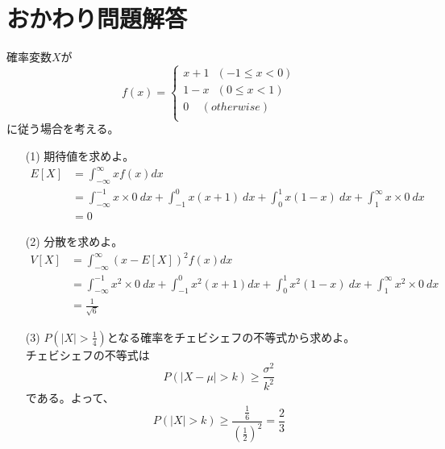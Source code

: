 \documentclass[a4j,uplatex,dvipdfmx]{jsarticle}
\begin{document}
\section*{おかわり問題解答}
確率変数$X$が
\begin{equation}
  f(x)=
 \begin{cases}
   x+1~~~(-1\le x<0)\\
   1-x~~~(0\le x<1)\\
   0~~~~~(otherwise)\\
 \end{cases}
\end{equation}
に従う場合を考える。
\begin{itemize}
  \item[(1)] 期待値を求めよ。
   \begin{equation}
     \begin{split}
       E[X] &= \int_{-\infty}^{\infty} x f(x) dx\\
       &= \int_{-\infty}^{-1} x\times 0\ dx + \int_{-1}^{0} x(x+1)\ dx + \int_{0}^{1} x(1-x)\ dx + \int_{1}^{\infty} x \times 0\ dx \\
       &= 0
     \end{split}
   \end{equation}
  \item[(2)] 分散を求めよ。
  \begin{equation}
    \begin{split}
      V[X] &= \int_{-\infty}^{\infty} (x-E[X])^2f(x) dx \\
      &=\int_{-\infty}^{-1} x^2\times 0\ dx + \int_{-1}^{0} x^2(x+1) dx + \int_{0}^{1} x^2(1-x)\ dx + \int_{1}^{\infty} x^2 \times 0\ dx \\
      &=\frac{1}{\sqrt{6}}
    \end{split}
  \end{equation} 
  \item[(3)] $\displaystyle P(|X|>\frac{1}{4})$となる確率をチェビシェフの不等式から求めよ。\\
  チェビシェフの不等式は
  \begin{equation}
      P(|X-\mu|>k)\ge \frac{\sigma ^2}{k^2}
  \end{equation} 
  である。よって、
  \begin{equation}
    P(|X|>k)\ge \frac{\frac{1}{6}}{\left( \frac{1}{2} \right)^2} = \frac{2}{3}
  \end{equation}
\end{itemize}
\end{document}
